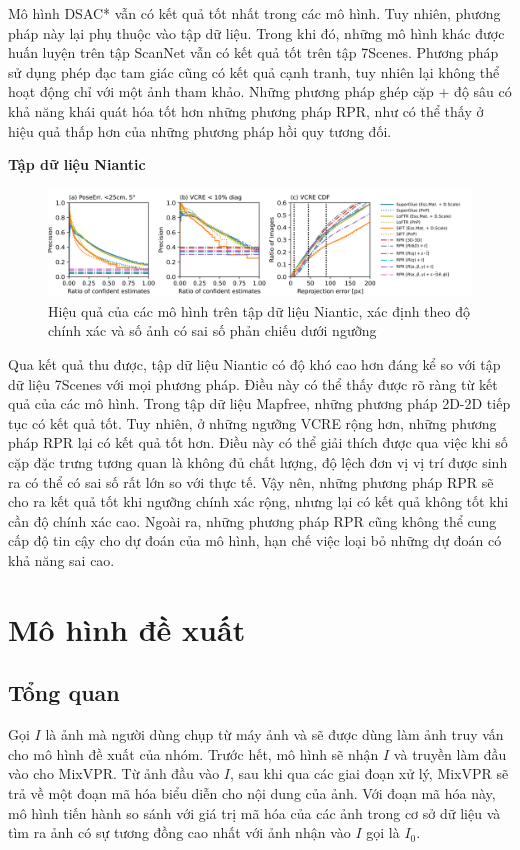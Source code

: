 Mô hình DSAC* vẫn có kết quả tốt nhất trong các mô hình. Tuy nhiên, phương pháp này lại phụ thuộc vào tập dữ liệu. Trong khi đó, những mô hình khác được huấn luyện trên tập ScanNet vẫn có kết quả tốt trên tập 7Scenes. Phương pháp sử dụng phép đạc tam giác cũng có kết quả cạnh tranh, tuy nhiên lại không thể hoạt động chỉ với một ảnh tham khảo. Những phương pháp ghép cặp + độ sâu có khả năng khái quát hóa tốt hơn những phương pháp RPR, như có thể thấy ở hiệu quả thấp hơn của những phương pháp hồi quy tương đối.

\textbf{Tập dữ liệu Niantic \cite{arnold2022mapfree}}

\begin{figure}[H]
    \centering
    \includegraphics[scale=0.4]{pics/Proposal/all_niantic.png}
    \caption{Hiệu quả của các mô hình trên tập dữ liệu Niantic, xác định theo độ chính xác và số ảnh có sai số phản chiếu dưới ngưỡng}
\end{figure}

Qua kết quả thu được, tập dữ liệu Niantic có độ khó cao hơn đáng kể so với tập dữ liệu 7Scenes với mọi phương pháp. Điều này có thể thấy được rõ ràng từ kết quả của các mô hình. Trong tập dữ liệu Mapfree, những phương pháp 2D-2D tiếp tục có kết quả tốt. Tuy nhiên, ở những ngưỡng VCRE rộng hơn, những phương pháp RPR lại có kết quả tốt hơn. Điều này có thể giải thích được qua việc khi số cặp đặc trưng tương quan là không đủ chất lượng, độ lệch đơn vị vị trí được sinh ra có thể có sai số rất lớn so với thực tế. Vậy nên, những phương pháp RPR sẽ cho ra kết quả tốt khi ngưỡng chính xác rộng, nhưng lại có kết quả không tốt khi cần độ chính xác cao. Ngoài ra, những phương pháp RPR cũng không thể cung cấp độ tin cậy cho dự đoán của mô hình, hạn chế việc loại bỏ những dự đoán có khả năng sai cao.

\section{Mô hình đề xuất}
\subsection{Tổng quan}
Gọi $I$ là ảnh mà người dùng chụp từ máy ảnh và sẽ được dùng làm ảnh truy vấn cho mô hình đề xuất của nhóm. Trước hết, mô hình sẽ nhận $I$ và truyền làm đầu vào cho MixVPR. Từ ảnh đầu vào $I$, sau khi qua các giai đoạn xử lý, MixVPR sẽ trả về một đoạn mã hóa biểu diễn cho nội dung của ảnh. Với đoạn mã hóa này, mô hình tiến hành so sánh với giá trị mã hóa của các ảnh trong cơ sở dữ liệu và tìm ra ảnh có sự tương đồng cao nhất với ảnh nhận vào $I$ gọi là $I_0$.

